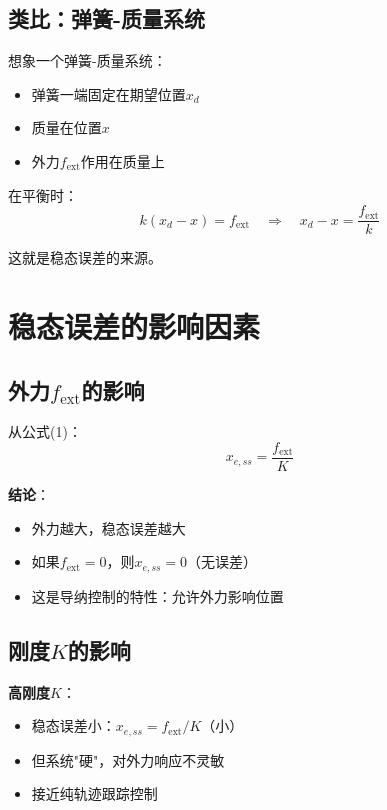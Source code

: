 \documentclass[12pt,a4paper]{article}
\begin{document}
\subsection{类比：弹簧-质量系统}

想象一个弹簧-质量系统：
\begin{itemize}
\item 弹簧一端固定在期望位置$x_d$
\item 质量在位置$x$
\item 外力$f_{\text{ext}}$作用在质量上
\end{itemize}

在平衡时：
\begin{equation}
k(x_d - x) = f_{\text{ext}} \quad \Rightarrow \quad x_d - x = \frac{f_{\text{ext}}}{k}
\end{equation}

这就是稳态误差的来源。

\section{稳态误差的影响因素}

\subsection{外力$f_{\text{ext}}$的影响}

从公式(1)：
\begin{equation}
x_{e,ss} = \frac{f_{\text{ext}}}{K}
\end{equation}

\textbf{结论}：
\begin{itemize}
\item 外力越大，稳态误差越大
\item 如果$f_{\text{ext}} = 0$，则$x_{e,ss} = 0$（无误差）
\item 这是导纳控制的特性：允许外力影响位置
\end{itemize}

\subsection{刚度$K$的影响}

\textbf{高刚度$K$}：
\begin{itemize}
\item 稳态误差小：$x_{e,ss} = f_{\text{ext}}/K$（小）
\item 但系统"硬"，对外力响应不灵敏
\item 接近纯轨迹跟踪控制
\end{itemize}
\end{document}
